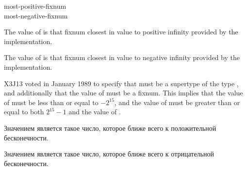 \begin{defun}[Constant]
most-positive-fixnum \\
most-negative-fixnum

The value of  is that fixnum closest in value to
positive infinity provided by the implementation.

The value of  is that fixnum closest in value to
negative infinity provided by the implementation.

\begin{new}
X3J13 voted in January 1989
to specify that  must be a supertype
of the type , and additionally that the value
of  must be a fixnum.  This implies that the value
of  must be less than or equal to $-2^{15}$,
and the value of  must be greater than or equal to
both $2^{15}-1$ and the value of .
\end{new}

Значением  является такое число, которое ближе всего
к положительной бесконечности.

Значением  является такое число, которое ближе всего
к отрицательной бесконечности.
\end{defun}

